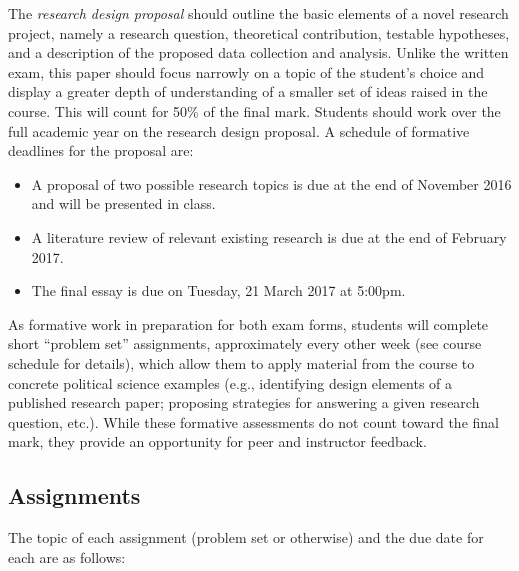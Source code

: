 \documentclass[12pt,a4paper]{article}
\begin{document}
The \textit{research design proposal} should outline the basic elements of a novel research project, namely a research question, theoretical contribution, testable hypotheses, and a description of the proposed data collection and analysis. Unlike the written exam, this paper should focus narrowly on a topic of the student's choice and display a greater depth of understanding of a smaller set of ideas raised in the course. This will count for 50\% of the final mark. Students should work over the full academic year on the research design proposal. A schedule of formative deadlines for the proposal are:

\begin{itemize}
\item A proposal of two possible research topics is due at the end of November 2016 and will be presented in class.
\item A literature review of relevant existing research is due at the end of February 2017.
\item The final essay is due on Tuesday, 21 March 2017 at 5:00pm.
\end{itemize}

As formative work in preparation for both exam forms, students will complete short ``problem set'' assignments, approximately every other week (see course schedule for details), which allow them to apply material from the course to concrete political science examples (e.g., identifying design elements of a published research paper; proposing strategies for answering a given research question, etc.). While these formative assessments do not count toward the final mark, they provide an opportunity for peer and instructor feedback.

\subsection{Assignments}

The topic of each assignment (problem set or otherwise) and the due date for each are as follows:
\end{document}
